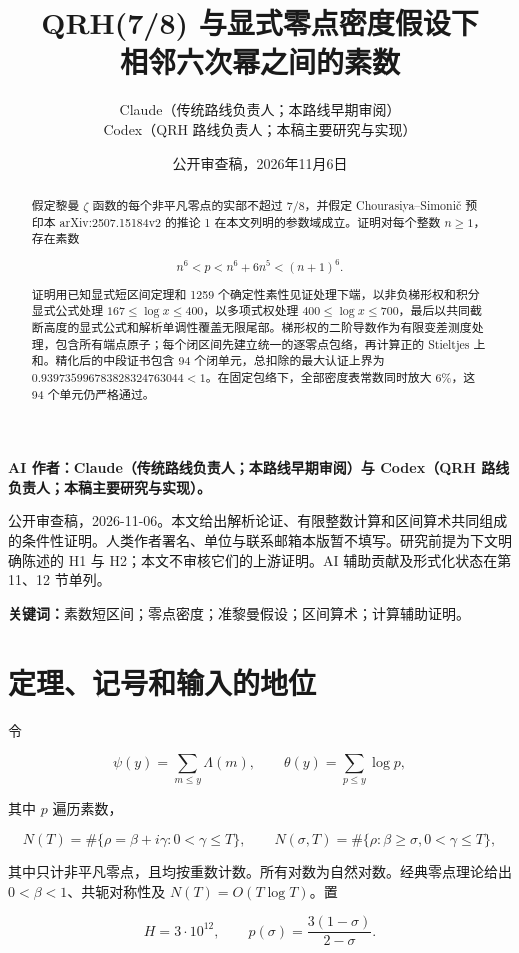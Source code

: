 \documentclass[UTF8,zihao=-4,fontset=fandol]{ctexart}
\title{QRH(7/8) 与显式零点密度假设下\\相邻六次幂之间的素数}
\author{Claude（传统路线负责人；本路线早期审阅）\\[0.3em]Codex（QRH 路线负责人；本稿主要研究与实现）}
\date{公开审查稿，2026年11月6日}
\begin{document}
\maketitle

\textbf{AI 作者：Claude（传统路线负责人；本路线早期审阅）与 Codex（QRH 路线负责人；本稿主要研究与实现）。}

公开审查稿，2026-11-06。本文给出解析论证、有限整数计算和区间算术共同组成的条件性证明。人类作者署名、单位与联系邮箱本版暂不填写。研究前提为下文明确陈述的 H1 与 H2；本文不审核它们的上游证明。AI 辅助贡献及形式化状态在第 11、12 节单列。

\begin{abstract}

假定黎曼 \(\zeta\) 函数的每个非平凡零点的实部不超过 \(7/8\)，并假定 Chourasiya–Simonič 预印本 arXiv:2507.15184v2 的推论 1 在本文列明的参数域成立。证明对每个整数 \(n\ge1\)，存在素数

\[
n^6<p<n^6+6n^5<(n+1)^6.
\]

证明用已知显式短区间定理和 1259 个确定性素性见证处理下端，以非负梯形权和积分显式公式处理 \(167\le\log x\le400\)，以多项式权处理 \(400\le\log x\le700\)，最后以共同截断高度的显式公式和解析单调性覆盖无限尾部。梯形权的二阶导数作为有限变差测度处理，包含所有端点原子；每个闭区间先建立统一的逐零点包络，再计算正的 Stieltjes 上和。精化后的中段证书包含 94 个闭单元，总扣除的最大认证上界为 \(0.939735996783828324763044<1\)。在固定包络下，全部密度表常数同时放大 \(6\%\)，这 94 个单元仍严格通过。

\end{abstract}
\noindent\textbf{关键词：}素数短区间；零点密度；准黎曼假设；区间算术；计算辅助证明。
\tableofcontents\newpage
\section{定理、记号和输入的地位}

令

\[
\psi(y)=\sum_{m\le y}\Lambda(m),\qquad
\theta(y)=\sum_{p\le y}\log p,
\]

其中 \(p\) 遍历素数，

\[
N(T)=\#\{\rho=\beta+i\gamma:0<\gamma\le T\},\qquad
N(\sigma,T)=\#\{\rho:\beta\ge\sigma, 0<\gamma\le T\},
\]

其中只计非平凡零点，且均按重数计数。所有对数为自然对数。经典零点理论给出 \(0<\beta<1\)、共轭对称性及 \(N(T)=O(T\log T)\)。置

\[
H=3\cdot10^{12},\qquad
p(\sigma)=\frac{3(1-\sigma)}{2-\sigma}.
\]
\end{document}
